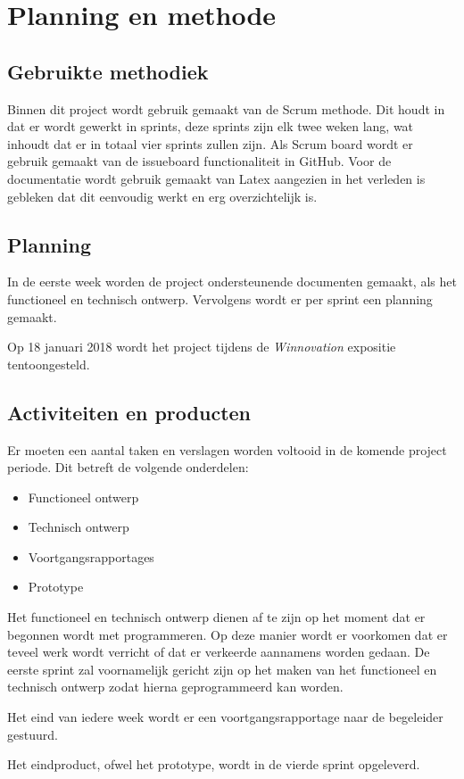 \section{Planning en methode}

\subsection{Gebruikte methodiek}
Binnen dit project wordt gebruik gemaakt van de Scrum methode. Dit houdt
in dat er wordt gewerkt in sprints, deze sprints zijn elk twee
weken lang, wat inhoudt dat er in totaal vier sprints zullen zijn. Als
Scrum board wordt er gebruik gemaakt van de issueboard functionaliteit
in GitHub. Voor de documentatie wordt gebruik gemaakt van Latex aangezien
in het verleden is gebleken dat dit eenvoudig werkt en erg overzichtelijk is.

\subsection{Planning}
In de eerste week worden de project ondersteunende documenten gemaakt, als het
functioneel en technisch ontwerp. Vervolgens wordt er per sprint een planning
gemaakt.

Op 18 januari 2018 wordt het project tijdens de \textit{Winnovation} expositie
tentoongesteld.

\subsection{Activiteiten en producten}
Er moeten een aantal taken en verslagen worden voltooid in de komende
project periode. Dit betreft de volgende onderdelen:
\begin{itemize}
  	\item Functioneel ontwerp
  	\item Technisch ontwerp
    \item Voortgangsrapportages
	\item Prototype
\end{itemize}
Het functioneel en technisch ontwerp dienen af te zijn op het moment dat 
er begonnen wordt met programmeren. Op deze manier wordt er voorkomen 
dat er teveel werk wordt verricht of dat er verkeerde aannamens worden 
gedaan. De eerste sprint zal voornamelijk gericht zijn op het maken van 
het functioneel en technisch ontwerp zodat hierna geprogrammeerd kan
worden.

Het eind van iedere week wordt er een voortgangsrapportage naar de begeleider
gestuurd.

Het eindproduct, ofwel het prototype, wordt in de vierde sprint opgeleverd.
